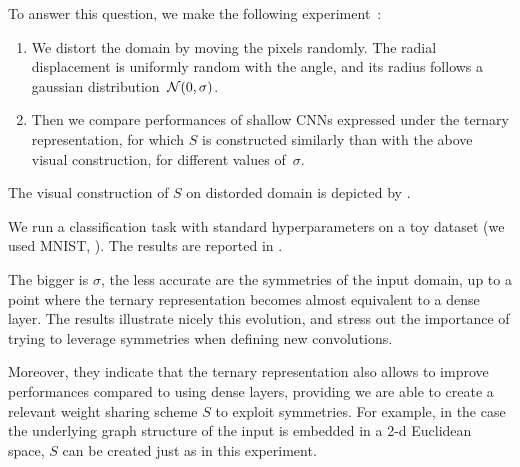 To answer this question, we make the following experiment~\citep{vialatte2016generalizing}:
\begin{enumerate}
\item We distort the domain by moving the pixels randomly. The radial displacement is uniformly random with the angle, and its radius follows a gaussian distribution~$\mathcal{N}(0,\sigma)$.
\item Then we compare performances of shallow CNNs expressed under the ternary representation, for which $S$ is constructed similarly than with the above visual construction, for different values of~$\sigma$.
\end{enumerate}

The visual construction of $S$ on distorded domain is depicted by .



We run a classification task with standard hyperparameters on a toy dataset (we used MNIST, \cite{lecun1998mnist}). The results are reported in .



The bigger is $\sigma$, the less accurate are the symmetries of the input domain, up to a point where the ternary representation becomes almost equivalent to a dense layer. The results illustrate nicely this evolution, and stress out the importance of trying to leverage symmetries when defining new convolutions.

Moreover, they indicate that the ternary representation also allows to improve performances compared to using dense layers, providing we are able to create a relevant weight sharing scheme $S$ to exploit symmetries. For example, in the case the underlying graph structure of the input is embedded in a 2-d Euclidean space, $S$ can be created just as in this experiment.



